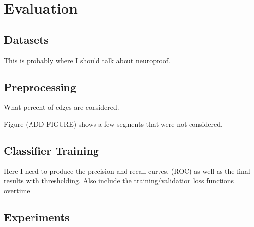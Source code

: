 \section{Evaluation}

\subsection{Datasets}

This is probably where I should talk about neuroproof.

\subsection{Preprocessing}

What percent of edges are considered.

Figure (ADD FIGURE) shows a few segments that were not considered. 

\subsection{Classifier Training}

Here I need to produce the precision and recall curves, (ROC) as well as the final results with thresholding. Also include the training/validation loss functions overtime

\subsection{Experiments}
